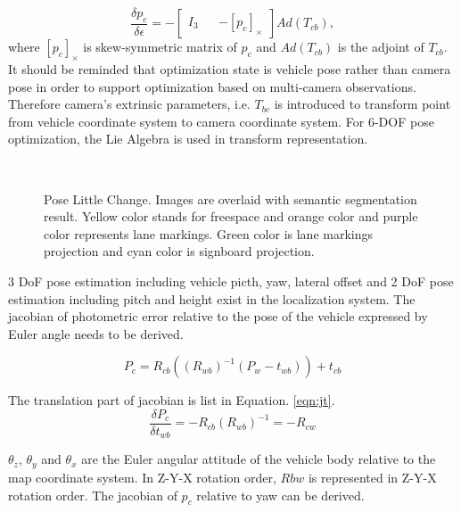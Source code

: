 \documentclass[letterpaper, 10 pt, conference]{ieeeconf}
\begin{document}
\begin{equation}
\frac{\delta p_{c}}{\delta \epsilon} = -\left [ \begin{matrix}  I_{3} && -[p_{c}]_{\times} \end{matrix} \right] Ad(T_{cb}),
\label{eqn:cheap}
\end{equation}
where $[p_{c}]_{\times}$ is skew-symmetric matrix of $p_{c}$ and $Ad(T_{cb})$ is the adjoint of $T_{cb}$. It should be reminded that optimization state is vehicle pose rather than camera pose in order to support optimization based on multi-camera observations. Therefore camera's extrinsic parameters, i.e. $T_{bc}$ is introduced to transform point from vehicle coordinate system to camera coordinate system. For 6-DOF pose optimization, the Lie Algebra is used in transform representation.

\begin{figure}[htb]
  \\
  \caption{Pose Little Change. Images are overlaid with semantic segmentation result. Yellow color stands for freespace and orange color and purple color represents lane markings. Green color is lane markings projection and cyan color is signboard projection.} \label{figure:pose vibration}
\end{figure}

3 DoF pose estimation including vehicle picth, yaw, lateral offset and 2 DoF pose estimation including pitch and height exist in the localization system. The jacobian of photometric error relative to the pose of the vehicle expressed by Euler angle needs to be derived.

\begin{equation}
    P_{c} = R_{cb}((R_{wb})^{-1}(P_{w} - t_{wb})) + t_{cb}
\end{equation}

The translation part of jacobian is list in Equation. \ref{eqn:jt}.
\begin{equation}
    \frac{\delta P_{c}}{\delta t_{wb}} = -R_{cb}(R_{wb})^{-1} = -R_{cw}
\label{eqn:jt}
\end{equation}

$\theta_z$, $\theta_y$ and $\theta_x$  are the Euler angular attitude of the vehicle body relative to the map coordinate system. In Z-Y-X rotation order, $Rbw$ is represented in Z-Y-X rotation order. The jacobian of $p_{c}$ relative to yaw can be derived. 

\end{document}
